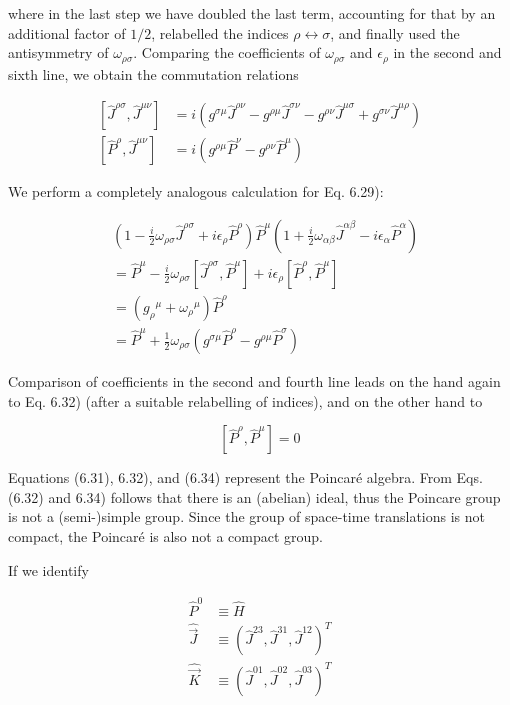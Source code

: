 \documentclass[10pt, letterpaper]{article}
\begin{document}
where in the last step we have doubled the last term, accounting for that by an additional factor of $1 / 2$, relabelled the indices $\rho \leftrightarrow \sigma$, and finally used the antisymmetry of $\omega_{\rho \sigma}$. Comparing the coefficients of $\omega_{\rho \sigma}$ and $\epsilon_{\rho}$ in the second and sixth line, we obtain the commutation relations

$$
\begin{aligned}
{\left[\hat{J}^{\rho \sigma}, \hat{J}^{\mu \nu}\right] } & =i\left(g^{\sigma \mu} \hat{J}^{\rho \nu}-g^{\rho \mu} \hat{J}^{\sigma \nu}-g^{\rho \nu} \hat{J}^{\mu \sigma}+g^{\sigma \nu} \hat{J}^{\mu \rho}\right) \\
{\left[\hat{P}^{\rho}, \hat{J}^{\mu \nu}\right] } & =i\left(g^{\rho \mu} \hat{P}^{\nu}-g^{\rho \nu} \hat{P}^{\mu}\right)
\end{aligned}
$$

We perform a completely analogous calculation for Eq. 6.29):

$$
\begin{aligned}
& \left(1-\frac{i}{2} \omega_{\rho \sigma} \hat{J}^{\rho \sigma}+i \epsilon_{\rho} \hat{P}^{\rho}\right) \hat{P}^{\mu}\left(1+\frac{i}{2} \omega_{\alpha \beta} \hat{J}^{\alpha \beta}-i \epsilon_{\alpha} \hat{P}^{\alpha}\right) \\
& =\hat{P}^{\mu}-\frac{i}{2} \omega_{\rho \sigma}\left[\hat{J}^{\rho \sigma}, \hat{P}^{\mu}\right]+i \epsilon_{\rho}\left[\hat{P}^{\rho}, \hat{P}^{\mu}\right] \\
& =\left(g_{\rho}{ }^{\mu}+\omega_{\rho}{ }^{\mu}\right) \hat{P}^{\rho} \\
& =\hat{P}^{\mu}+\frac{1}{2} \omega_{\rho \sigma}\left(g^{\sigma \mu} \hat{P}^{\rho}-g^{\rho \mu} \hat{P}^{\sigma}\right)
\end{aligned}
$$

Comparison of coefficients in the second and fourth line leads on the hand again to Eq. 6.32) (after a suitable relabelling of indices), and on the other hand to

$$
\left[\hat{P}^{\rho}, \hat{P}^{\mu}\right]=0
$$

Equations (6.31), 6.32), and (6.34) represent the Poincaré algebra. From Eqs. (6.32) and 6.34) follows that there is an (abelian) ideal, thus the Poincare group is not a (semi-)simple group. Since the group of space-time translations is not compact, the Poincaré is also not a compact group.

If we identify

$$
\begin{aligned}
\hat{P}^{0} & \equiv \hat{H} \\
\hat{\vec{J}} & \equiv\left(\hat{J}^{23}, \hat{J}^{31}, \hat{J}^{12}\right)^{T} \\
\hat{\vec{K}} & \equiv\left(\hat{J}^{01}, \hat{J}^{02}, \hat{J}^{03}\right)^{T}
\end{aligned}
$$
\end{document}

